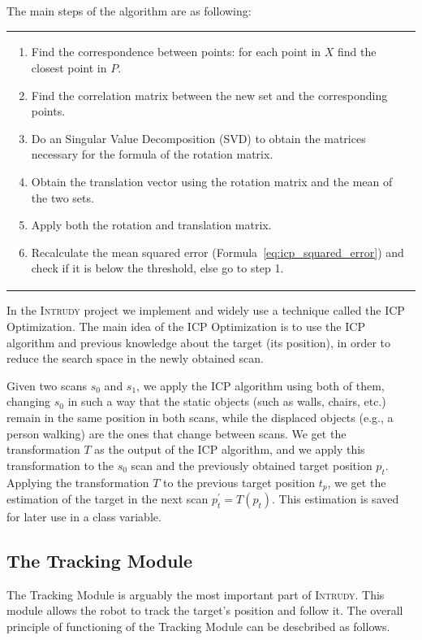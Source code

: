 \documentclass[12pt,a4paper]{scrartcl}
\newcommand{\intrudy}{\textsc{Intrudy}\xspace}
\newenvironment{algorithmframe}
{\begin{tabular}{|p{0.95\textwidth}}}%
{\end{tabular}}
\begin{document}
The main steps of the algorithm are as following:\\
\begin{algorithmframe}
\begin{enumerate}[itemsep=0pt,topsep=0pt]
	\item Find the correspondence between points: for each point in $X$ find the closest point in $P$.
	\item Find the correlation matrix between the new set and the corresponding points.
	\item Do an Singular Value Decomposition (SVD) to obtain the matrices necessary for the formula of the rotation matrix.
	\item Obtain the translation vector using the rotation matrix and the mean of the two sets.
	\item Apply both the rotation and translation matrix.
	\item Recalculate the mean squared error (Formula~\ref{eq:icp_squared_error}) and check if it is below the threshold, else go to step 1.
\end{enumerate}
\end{algorithmframe}

In the \intrudy project we implement and widely use a technique called the ICP Optimization. The main idea of the ICP Optimization is to use the ICP algorithm and previous knowledge about the target (its position), in order to reduce the search space in the newly obtained scan.

Given two scans $s_0$ and $s_1$, we apply the ICP algorithm using both of them, changing $s_0$ in such a way that the static objects (such as walls, chairs, etc.) remain in the same position in both scans, while the displaced objects (e.g., a person walking) are the ones that change between scans. We get the transformation $T$ as the output of the ICP algorithm, and we apply this transformation to the $s_0$ scan and the previously obtained target position $p_t$. Applying the transformation $T$ to the previous target position $t_p$, we get the estimation of the target in the next scan $p_{t}^{\prime} = T(p_t)$. This estimation is saved for later use in a class variable.


\subsection{The Tracking Module} %
\label{sub:the_tracking_module}
The Tracking Module is arguably the most important part of \intrudy. This module allows the robot to track the target's position and follow it. The overall principle of functioning of the Tracking Module can be descbribed as follows.
\end{document}
